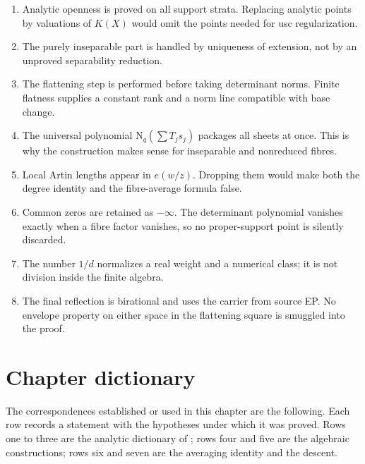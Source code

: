 \begin{enumerate}
\item Analytic openness is proved on all support strata.  Replacing
      analytic points by valuations of $K(X)$ would omit the points
      needed for usc regularization.
\item The purely inseparable part is handled by uniqueness of extension,
      not by an unproved separability reduction.
\item The flattening step is performed before taking determinant norms.
      Finite flatness supplies a constant rank and a norm line compatible
      with base change.
\item The universal polynomial
      $\mathrm N_q(\sum T_js_j)$ packages all sheets at once.  This is why
      the construction makes sense for inseparable and nonreduced fibres.
\item Local Artin lengths appear in $e(w/z)$.  Dropping them would make
      both the degree identity and the fibre-average formula false.
\item Common zeros are retained as $-\infty$.  The determinant
      polynomial vanishes exactly when a fibre factor vanishes, so no
      proper-support point is silently discarded.
\item The number $1/d$ normalizes a real weight and a numerical class;
      it is not division inside the finite algebra.
\item The final reflection is birational and uses the carrier from source
      EP.  No envelope property on either space in the flattening square
      is smuggled into the proof.
\end{enumerate}

\section{Chapter dictionary}
\label{sec:ch41-dictionary}

The correspondences established or used in this chapter are the following.
Each row records a statement with the hypotheses under which it was proved.
Rows one to three are the analytic dictionary of
; rows four and five are the algebraic
constructions; rows six and seven are the averaging identity and the
descent.

